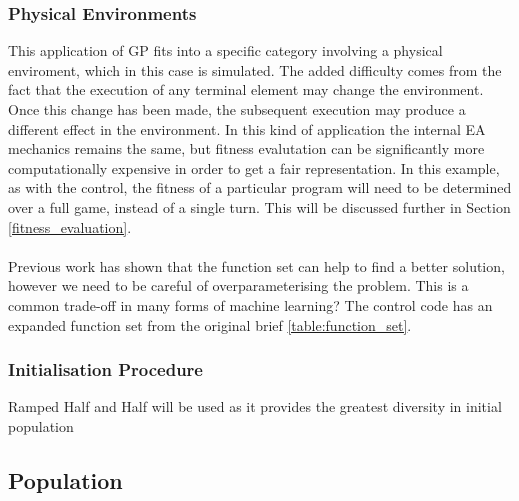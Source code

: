\documentclass{article}
\begin{document}
\subsubsection{Physical Environments}
This application of GP fits into a specific category involving a physical enviroment, which in this case is simulated. The added difficulty comes from the fact that the execution of any terminal element may change the environment. Once this change has been made, the subsequent execution may produce a different effect in the environment. In this kind of application the internal EA mechanics remains the same, but fitness evalutation can be significantly more computationally expensive\cite[p. 110]{textbook} in order to get a fair representation. In this example, as with the control, the fitness of a particular program will need to be determined over a full game, instead of a single turn. This will be discussed further in Section \ref{fitness_evaluation}.
\\\\
Previous work has shown that the function set can help to find a better solution, however we need to be careful of overparameterising the problem.%
This is a common trade-off in many forms of machine learning?
The control code has an expanded function set from the original brief
\ref{table:function_set}.

\subsubsection{Initialisation Procedure}
Ramped Half and Half will be used as it provides the greatest diversity in initial population

\subsection{Population}
\end{document}
